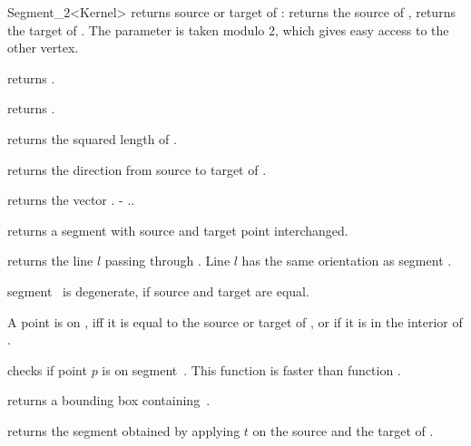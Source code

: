 \begin{ccRefClass} {Segment_2<Kernel>}
       {returns source or target   of \ccVar:    returns
        the source of \ccVar,  returns the target of \ccVar. 
        The parameter  is taken modulo 2, which gives 
        easy access to the other vertex. }

        {returns .}

       {returns .}

       {returns the squared length of \ccVar. }

       {returns the direction from source to target of \ccVar.}

       {returns the vector \ccVar. - \ccVar..}


       {returns a segment with source and target point interchanged.}

       {returns the line $l$ passing through \ccVar. Line $l$  has the
        same orientation as segment \ccVar.}

\ccPredicates

       {segment \ccVar\ is degenerate, if source and target are equal.}

       {}
\ccGlue
{}
       {}

       {A point is on \ccVar, iff it is equal to the source or target 
        of \ccVar, or if it is in the interior of \ccVar.}

       {checks if point $p$ is on segment~\ccVar. This function is faster
        than function .
        }


       {returns a bounding box containing~\ccVar.}

       {returns the segment obtained by applying $t$ on the source
        and the target of \ccVar.}

\ccSeeAlso
{}\\

\end{ccRefClass} 
